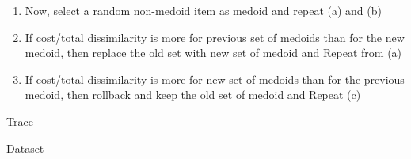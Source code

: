 \documentclass[12pt]{article}
\renewcommand{\_}{\kern-1.5pt\textunderscore\kern-1.5pt}
\begin{document}
\begin{enumerate}
\begin{enumerate}
\begin{enumerate}
	\item {\fontsize{14pt}{16.8pt}\selectfont Now, select a random non-medoid item as medoid and repeat (a) and (b)\par}\par

	\item {\fontsize{14pt}{16.8pt}\selectfont If cost/total dissimilarity is more for previous set of medoids than for the new medoid, then replace the old set with new set of medoid and Repeat from (a)\par}\par

	\item {\fontsize{14pt}{16.8pt}\selectfont If cost/total dissimilarity is more for new set of medoids than for the previous medoid, then rollback and keep the old set of medoid and Repeat (c)\par}
\end{enumerate}
\end{enumerate}\par

{\fontsize{14pt}{16.8pt}\selectfont \uline{Trace}\par}\par

{\fontsize{14pt}{16.8pt}\selectfont Dataset\par}\par






\end{enumerate}
\end{document}
